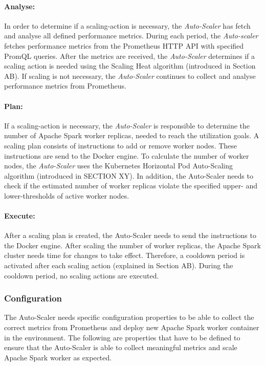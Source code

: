 \paragraph{Analyse:}
In order to determine if a scaling-action is necessary, the \textit{Auto-Scaler} has fetch and analyse all defined performance metrics. 
During each period, the \textit{Auto-scaler} fetches performance metrics from the Prometheus HTTP API with specified PromQL queries.
After the metrics are received, the \textit{Auto-Scaler} determines if a scaling action is needed using the Scaling Heat algorithm (introduced in Section AB). If scaling is not necessary, the \textit{Auto-Scaler} continues to collect and analyse performance metrics from Prometheus.

\paragraph{Plan:}
If a scaling-action is necessary, the \textit{Auto-Scaler} is responsible to determine the number of Apache Spark worker replicas, needed to reach the utilization goals.
A scaling plan consists of instructions to add or remove worker nodes. These instructions are send to the Docker engine.
To calculate the number of worker nodes, the \textit{Auto-Scaler} uses the Kubernetes Horizontal Pod Auto-Scaling algorithm (introduced in SECTION XY).
In addition, the Auto-Scaler needs to check if the estimated number of worker replicas violate the specified upper- and lower-thresholds of active worker nodes.

\paragraph{Execute:}
After a scaling plan is created, the Auto-Scaler needs to send the instructions to the Docker engine.
After scaling the number of worker replicas, the Apache Spark cluster needs time for changes to take effect. Therefore, a cooldown period is activated after each scaling action (explained in Section AB).
During the cooldown period, no scaling actions are executed.


\subsubsection{Configuration}
The Auto-Scaler needs specific configuration properties to be able to collect the correct metrics from Prometheus and deploy new Apache Spark worker container in the environment. The following are properties that have to be defined to ensure that the Auto-Scaler is able to collect meaningful metrics and scale Apache Spark worker as expected.

